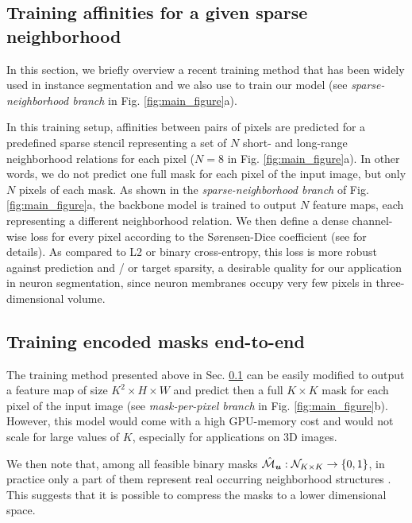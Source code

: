 \subsection{Training affinities for a given sparse neighborhood}\label{sec:affs_from_sparse}
In this section, we briefly overview a recent training method that has been widely used in instance segmentation \cite{liu2018affinity,Gao_2019_ICCV,lee2017superhuman,wolf2018mutex,bailoni2019generalized} and we also use to train our model (see \emph{sparse-neighborhood branch} in Fig. \ref{fig:main_figure}a).

In this training setup, affinities between pairs of pixels are predicted for a predefined sparse stencil representing a set of $N$ short- and long-range neighborhood relations for each pixel ($N=8$ in Fig. \ref{fig:main_figure}a). In other words, we do not predict one full \maskname mask for each pixel of the input image, but only $N$ pixels of each \maskname mask. 
As shown in the \emph{sparse-neighborhood branch} of Fig. \ref{fig:main_figure}a, the backbone model is trained to output $N$ feature maps, each representing a different neighborhood relation. We then define a dense channel-wise loss for every pixel according to the S\o rensen-Dice coefficient \cite{dice1945measures,sorensen1948method} (see \cite{wolf2018mutex} for details).
As compared to L2 or binary cross-entropy, this loss is more robust against prediction and / or target sparsity, a desirable quality for our application in neuron segmentation, since neuron membranes occupy very few pixels in three-dimensional volume.

\subsection{Training encoded \maskname masks end-to-end}\label{sec:encoding_masks}
The training method presented above in Sec. \ref{sec:affs_from_sparse} can be easily modified to output a feature map of size $K^2 \times H \times W$ and predict then a full $K\times K$ \maskname mask for each pixel of the input image (see \emph{mask-per-pixel branch} in Fig. \ref{fig:main_figure}b).
However, this model would come with a high GPU-memory cost and would not scale for large values of $K$, especially for applications on 3D images.

We then note that, among all feasible binary masks $\hat{\mathcal{M}}_{\coord{u}}: \mathcal{N}_{K\times K} \rightarrow \{0,1\}$, in practice only a part of them represent real occurring neighborhood structures . 
This suggests that it is possible to compress the masks to a lower dimensional space. 

